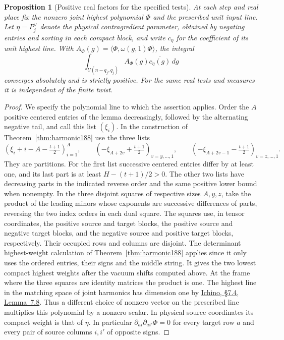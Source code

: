 \documentclass[a4paper,11pt]{article}
\newtheorem{proposition}{Proposition}[section]
\theoremstyle{definition}
\theoremstyle{remark}
\numberwithin{equation}{section}
\begin{document}
\begin{proposition}[Positive real factors for the specified tests]
\leavevmode\label{prop:rowrealgram809}
At each step and real place fix the nonzero joint highest polynomial
\(\Phi\) and the prescribed unit input line. Let
\(\eta=P_j^\vee\) denote the physical contragredient parameter,
obtained by negating entries and sorting in each compact block,
and write \(c_\eta\) for the coefficient of its unit highest line.
With \(A_\Phi(g)=\langle\Phi,\omega(g,1)\Phi\rangle\), the integral
\[
        \int_{U(n-q_j,q_j)}
               A_\Phi(g)\overline{c_\eta(g)}\,dg
\]
converges absolutely and is strictly positive. For the same real
tests and measures it is independent of the finite twist.
\end{proposition}
\begin{proof}
We specify the polynomial line to which the assertion applies.
Order the \(A\) positive centered entries of the lemma
decreasingly, followed by the alternating negative tail, and
call this list \((\xi_i)\). In the construction of
Theorem~\ref{thm:harmonic188} use the three lists
\[
 \left(\xi_i+i-A-\tfrac{t+1}{2}\right)_{i=1}^{A},\qquad
 \left(-\xi_{A+2v}+\tfrac{t+1}{2}\right)_{v=y,\ldots,1},\qquad
 \left(-\xi_{A+2v-1}-\tfrac{t+1}{2}\right)_{v=z,\ldots,1}.
\]
They are partitions. For the first list successive centered
entries differ by at least one, and its last part is at least
\(H-(t+1)/2>0\). The other two lists have decreasing parts
in the indicated reverse order and the same positive lower
bound when nonempty. In the three disjoint squares of respective
sizes \(A,y,z\), take the product of the leading minors whose
exponents are successive differences of parts, reversing the
two index orders in each dual square. The squares use, in
tensor coordinates, the positive source and target blocks,
the positive source and negative target blocks, and the negative
source and positive target blocks, respectively. Their occupied
rows and columns are disjoint. The determinant highest-weight
calculation of Theorem~\ref{thm:harmonic188} applies since it
only uses the ordered entries, their signs and the middle string.
It gives the two lowest compact highest weights after the
vacuum shifts computed above. At the frame where the three
squares are identity matrices the product is one. The highest
line in the matching space of joint harmonics has dimension
one by \href{https://arxiv.org/pdf/2002.09148}{Ichino,
\S7.4, Lemma~7.8}. Thus a different choice of nonzero vector
on the prescribed line multiplies this polynomial by a nonzero
scalar. In physical source coordinates its compact weight is
that of \(\eta\). In particular
\(\partial_{ai}\partial_{ai'}\Phi=0\) for every target row \(a\)
and every pair of source columns \(i,i'\) of opposite signs.


\end{proof}
\end{document}
